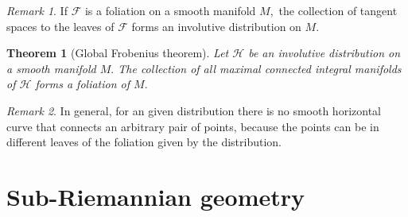 \documentclass [xcolor=svgnames, t] {beamer}
\theoremstyle{definition}
\theoremstyle{plain}
\newtheorem{thm}{Theorem}
\theoremstyle{remark}
\newtheorem{rem}{Remark}
\begin{document}
\begin{frame}
\begin{rem}
	If $ \mathcal{F} $ is a foliation on a smooth manifold $ M, $ the collection of tangent spaces to the leaves of $ \mathcal{F} $ forms an involutive distribution on $ M. $
\end{rem}
\begin{thm}[Global Frobenius theorem]
	Let $ \mathcal{H} $ be an involutive distribution on a smooth manifold $ M. $ The collection of all maximal connected integral manifolds of $ \mathcal{H} $ forms a foliation of $ M. $ 
\end{thm}
\begin{rem}
	In general, for an given distribution there is no smooth horizontal curve that connects an arbitrary pair of points, because the points can be in different leaves of the foliation given by the distribution.
\end{rem}
\end{frame}

\section{Sub-Riemannian geometry}
\end{document}
